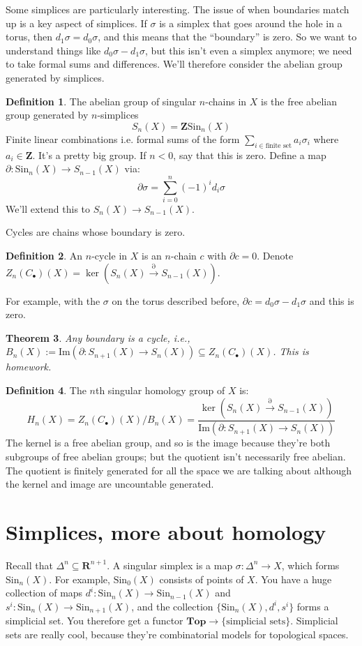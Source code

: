 \documentclass{amsart}
\theoremstyle{theorem}
\newtheorem{theorem}{Theorem}[section]
\theoremstyle{definition}
\newtheorem{definition}[theorem]{Definition}
\newcommand{\Sin}{\mathrm{Sin}}
\begin{document}
Some simplices are particularly interesting. The issue of when boundaries match up is a key aspect of simplices. If $\sigma$ is a simplex that goes around the hole in a torus, then $d_1\sigma = d_0\sigma$, and this means that the ``boundary'' is zero. So we want to understand things like $d_0\sigma - d_1\sigma$, but this isn't even a simplex anymore; we need to take formal sums and differences. We'll therefore consider the abelian group generated by simplices.
\begin{definition}
The abelian group of singular $n$-chains in $X$ is the free abelian group generated by $n$-simplices
$$S_n(X) = \mathbf{Z}\Sin_n(X)$$
Finite linear combinations i.e. formal sums of the form $\sum_{i\in\text{finite set}}a_i\sigma_i$ where $a_i\in\mathbf{Z}$. It's a pretty big group. If $n<0$, say that this is zero. Define a map $\partial:\Sin_n(X)\to S_{n-1}(X)$ via:
$$\partial\sigma = \sum_{i=0}^n(-1)^i d_i\sigma$$
We'll extend this to $S_n(X) \to S_{n-1}(X)$.
\end{definition}
Cycles are chains whose boundary is zero.
\begin{definition}
An $n$-cycle in $X$ is an $n$-chain $c$ with $\partial c = 0$. Denote $Z_n(C_\bullet)(X) = \ker(S_n(X)\xrightarrow{\partial}S_{n-1}(X))$.
\end{definition}
For example, with the $\sigma$ on the torus described before, $\partial c = d_0\sigma - d_1\sigma$ and this is zero.
\begin{theorem}
Any boundary is a cycle, i.e., $B_n(X) := \mathrm{Im}(\partial:S_{n+1}(X)\to S_n(X))\subseteq Z_n(C_\bullet)(X)$. This is homework.
\end{theorem}
\begin{definition}
The $n$th singular homology group of $X$ is:
$$ H_n(X) = Z_n(C_\bullet)(X)/B_n(X) = \frac{\ker(S_n(X)\xrightarrow{\partial}S_{n-1}(X))}{\mathrm{Im}(\partial:S_{n+1}(X)\to S_n(X))}$$
The kernel is a free abelian group, and so is the image because they're both subgroups of free abelian groups; but the quotient isn't necessarily free abelian. The quotient is finitely generated for all the space we are talking about although the kernel and image are uncountable generated.
\end{definition}
\section{Simplices, more about homology}
Recall that $\Delta^n\subseteq\mathbf{R}^{n+1}$. A singular simplex is a map $\sigma:\Delta^n\to X$, which forms $\Sin_n(X)$. For example, $\Sin_0(X)$ consists of points of $X$. You have a huge collection of maps $d^i:\Sin_n(X)\to\Sin_{n-1}(X)$ and $s^i:\Sin_n(X)\to\Sin_{n+1}(X)$, and the collection $\{\Sin_n(X),d^i,s^i\}$ forms a simplicial set. You therefore get a functor $\mathbf{Top}\to\{\text{simplicial sets}\}$. Simplicial sets are really cool, because they're combinatorial models for topological spaces.
\end{document}
